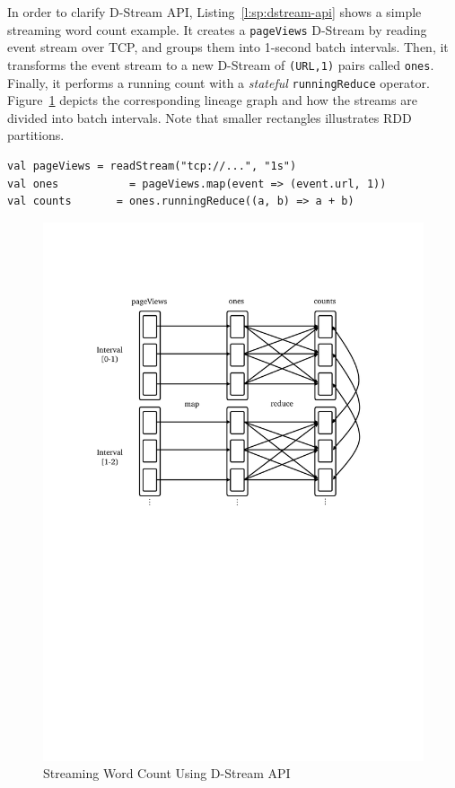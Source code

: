 In order to clarify D-Stream API, Listing~\ref{l:sp:dstream-api} shows a simple streaming word count example. It creates a \lstinline$pageViews$ D-Stream by
reading event stream over TCP, and groups them into 1-second batch intervals. Then, it transforms the event stream to a new D-Stream of \lstinline$(URL,1)$ pairs called
\lstinline$ones$. Finally, it performs a running count with a \emph{stateful} \lstinline$runningReduce$ operator. Figure~\ref{fig:sp:dstream-api} depicts the corresponding lineage graph and how the streams are divided into batch intervals. Note that smaller rectangles illustrates RDD partitions.
\begin{lstlisting}[float=h, caption={Streaming Word Count using D-Stream API},label={l:sp:dstream-api},captionpos=b,morekeywords={val}]
val pageViews = readStream("tcp://...", "1s")
val ones           = pageViews.map(event => (event.url, 1))
val counts       = ones.runningReduce((a, b) => a + b)
\end{lstlisting}
\begin{figure}[!htbp]
    \centering
    \includegraphics[clip,trim=2.5cm 14cm 3.2cm 4cm,scale=0.8]{dstream-example.pdf}
    \caption[Streaming Word Count Using D-Stream API]{Streaming Word Count Using D-Stream API\footnotemark}
    \label{fig:sp:dstream-api}
\end{figure}

